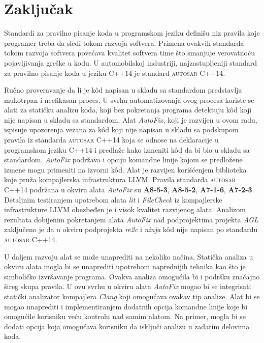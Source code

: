 \documentclass[12pt,oneside]{memoir}
\begin{document}



\chapter{Zaključak}

Standardi za pravilno pisanje koda u programskom jeziku defini\v{s}u niz pravila koje programer treba da sledi tokom razvoja softvera. Primena ovakvih standarda
tokom razvoja softvera pove\'{c}ava kvalitet softvera time \v{s}to smanjuje verovatno\'{c}u pojavljivanja gre\v{s}ke u kodu. U automobilskoj industriji,
najzastupljeniji standard za pravilno pisanje koda u jeziku C++14 je standard \textsc{autosar} C++14.
\par
Ru\v{c}no proveravanje da li je k\^{o}d napisan u skladu sa standardom predstavlja mukotrpan i neefikasan proces. U svrhu automatizovanja ovog procesa
koriste se alati za stati\v{c}ku analizu koda, koji bez pokretanja programa detektuju k\^{o}d koji nije napisan u skladu sa standardom. Alat \textit{AutoFix}, koji je razvijen u ovom radu, ispisuje upozorenja vezana za k\^{o}d koji nije napisan u skladu sa podskupom pravila iz standarda \textsc{autosar} C++14 koja se odnose na deklaracije u programskom jeziku C++14 i predla\v{z}e kako izmeniti k\^{o}d da bi bio u skladu sa standardom. \textit{AutoFix} podr\v{z}ava i opciju komandne linije kojom se predlo\v{z}ene izmene mogu primeniti na izvorni k\^{o}d. Alat je razvijen kori\v{s}\'{c}enjem biblioteka koje pru\v{z}a kompajlerska infrastruktura LLVM. Pravila standarda \textsc{autosar} C++14 podr\v{z}ana u okviru alata \textit{AutoFix} su \textbf{A8-5-3}, \textbf{A8-5-2}, \textbf{A7-1-6}, \textbf{A7-2-3}. Detaljnim testiranjem upotrebom alata \textit{lit} i \textit{FileCheck} iz kompajlerske infrastrukture LLVM obezbeđen je i visok kvalitet razvijenog alata. Analizom rezultata dobijenim pokretanjem alata \textit{AutoFix} nad podprojektima projekta \textit{AGL} zaklju\v{c}eno je da u okviru podprojekta \textit{re2c} i \textit{ninja} k\^{o}d nije napisan po standardu \textsc{autosar} C++14.

\par
U daljem razvoju alat se mo\v{z}e unaprediti na nekoliko na\v{c}ina. 
Stati\v{c}ka analiza u okviru alata mogla bi se unaprediti upotrebom naprednijih tehnika kao \v{s}to je simboli\v{c}ko izvr\v{s}avanje programa. Ovakva analiza
omogu\'{c}ila bi i podr\v{s}ku zna\v{c}ajno \v{s}ireg skupa pravila. U ovu svrhu u okviru alata \textit{AutoFix} mogao bi se integrisati stati\v{c}ki analizator kompajlera \textit{Clang} koji omogu\'{c}ava ovakav tip analize. Alat bi se mogao unaprediti i implementiranjem dodatnih opcija komandne linije koje bi omogu\'{c}ile korisniku ve\'{c}u
kontrolu nad samim alatom. Na primer, mogla bi se dodati opcija koja omogu\'{c}ava korisniku da isklju\v{c}i analizu u zadatim delovima koda.
\end{document}
